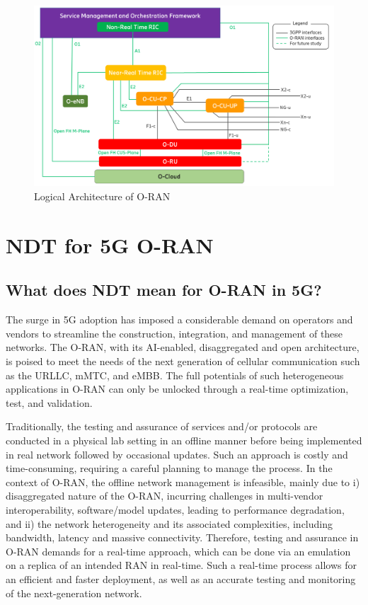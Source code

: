 \documentclass[]{IEEEtran}
\begin{document}
\begin{figure}[t]
	\centering
	\includegraphics[width=1\linewidth]{oran-logical-architecture}
	\caption{Logical Architecture of O-RAN \cite{O-RAN.WG1.O-RAN-Architecture-Description-v07.00}}
	\label{fig:oran-logical-architecture}
\end{figure}
	
	\section{NDT for 5G O-RAN} \label{sec:NDT_for_ORAN}
	
	\subsection{What does NDT mean for O-RAN in 5G?} 
	
	
	The surge in 5G adoption has imposed a considerable demand on operators and vendors to streamline the construction, integration, and management of these networks. The O-RAN, with its AI-enabled, disaggregated and open architecture, is poised to meet the needs of the next generation of cellular communication such as the URLLC, mMTC, and eMBB. The full potentials of such heterogeneous applications in O-RAN can only be unlocked through a real-time optimization, test, and validation.
	
	Traditionally, the testing and assurance of services and/or protocols are conducted in a physical lab setting in an offline manner before  being implemented in real network followed by occasional updates. Such an approach is costly and time-consuming, requiring a careful planning to manage the process. In the context of O-RAN, the offline network management is infeasible, mainly due to i) disaggregated nature of the O-RAN, incurring challenges in multi-vendor interoperability, software/model updates, leading to performance degradation, and ii) the network heterogeneity and its associated complexities, including bandwidth, latency and massive connectivity. Therefore, testing and assurance in O-RAN demands for a real-time approach, which can be done via an emulation on a replica of an intended RAN in real-time. Such a real-time process allows for an efficient and faster deployment, as well as an accurate testing and monitoring of the next-generation network. 
\end{document}
